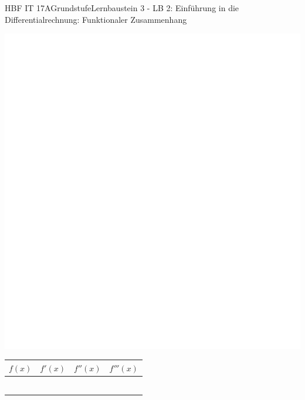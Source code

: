 \documentclass[oneside,openany,headings=optiontotoc,11pt,numbers=noenddot]{scrreprt}
\begin{document}
\begin{worksheet}{HBF IT 17A}{Grundstufe}{Lernbaustein 3 - LB 2: Einführung in die Differentialrechnung: Funktionaler Zusammenhang}
\begin{framed}
			\includegraphics[scale=0.1]{../empty.jpg}
			\begin{tabularx}{\textwidth}{|X|X|X|X|}
				\hline
				\multicolumn{1}{|c|}{\(f(x)\)} & \multicolumn{1}{c|}{\(f'(x)\)} & \multicolumn{1}{c|}{\(f''(x)\)} & \multicolumn{1}{c|}{\(f'''(x)\)}\\
				\hline
				\hline
				\rule{0pt}{80pt}&&&\\
				\hline
				\rule{0pt}{80pt}&&&\\
				\hline
				\rule{0pt}{80pt}&&&\\
				\hline
				\rule{0pt}{80pt}&&&\\
				\hline
				\rule{0pt}{80pt}&&&\\
				\hline
				\rule{0pt}{80pt}&&&\\
				\hline			
			\end{tabularx}
		\end{framed}
	\end{worksheet}
\end{document}
